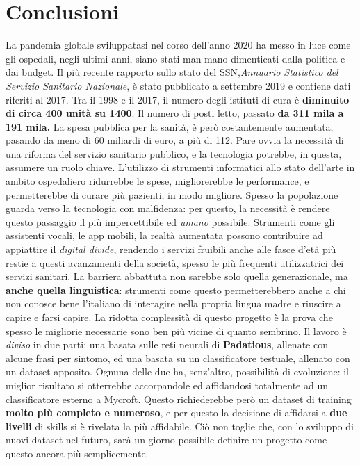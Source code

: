 \chapter{Conclusioni}
\label{chap:conclusioni}
La pandemia globale sviluppatasi nel corso dell'anno 2020 ha messo in luce come gli ospedali, negli ultimi anni, siano stati man mano dimenticati dalla politica e dai budget. Il più recente rapporto sullo stato del SSN,\textit{Annuario Statistico del Servizio Sanitario Nazionale}, è stato pubblicato a settembre 2019 e contiene dati riferiti al 2017.
Tra il 1998 e il 2017, il numero degli istituti di cura è \textbf{diminuito di circa 400 unità su 1400}. Il numero di posti letto, passato \textbf{da 311 mila a 191 mila.} La spesa pubblica per la sanità, è però costantemente aumentata, pasando da meno di 60 miliardi di euro, a più di 112. \cite{article:tagli-ospedali} Pare ovvia la necessità di una riforma del servizio sanitario pubblico, e la tecnologia potrebbe, in questa, assumere un ruolo chiave. L'utilizzo di strumenti informatici allo stato dell'arte in ambito ospedaliero ridurrebbe le spese, migliorerebbe le performance, e permetterebbe di curare più pazienti, in modo migliore.
Spesso la popolazione guarda verso la tecnologia con malfidenza: per questo, la necessità è rendere questo passaggio il più impercettibile ed \textit{umano} possibile. Strumenti come gli assistenti vocali, le app mobili, la realtà aumentata possono contribuire ad appiattire il \textit{digital divide}, rendendo i servizi fruibili anche alle fasce d'età più restie a questi avanzamenti della società, spesso le più frequenti utilizzatrici dei servizi sanitari.
La barriera abbattuta non sarebbe solo quella generazionale, ma \textbf{anche quella linguistica}: strumenti come questo permetterebbero anche a chi non conosce bene l'italiano di interagire nella propria lingua madre e riuscire a capire e farsi capire.
La ridotta complessità di questo progetto è la prova che spesso le migliorie necessarie sono ben più vicine di quanto sembrino.
Il lavoro è \textit{diviso} in due parti: una basata sulle reti neurali di \textbf{Padatious}, allenate con alcune frasi per sintomo, ed una basata su un classificatore testuale, allenato con un dataset apposito. Ognuna delle due ha, senz'altro, possibilità di evoluzione: il miglior risultato si otterrebbe accorpandole ed affidandosi totalmente ad un classificatore esterno a Mycroft. Questo richiederebbe però un dataset di training \textbf{molto più completo e numeroso}, e per questo la decisione di affidarsi a \textbf{due livelli} di skills si è rivelata la più affidabile. Ciò non toglie che, con lo sviluppo di nuovi dataset nel futuro, sarà un giorno possibile definire un progetto come questo ancora più semplicemente.
